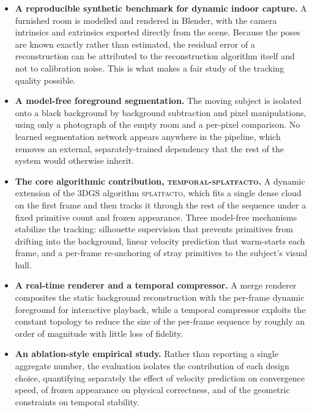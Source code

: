 \begin{itemize}
    \item \textbf{A reproducible synthetic benchmark for dynamic indoor
    capture.} A furnished room is modelled and rendered in Blender, with the
    camera intrinsics and extrinsics exported directly from the scene. Because
    the poses are known exactly rather than estimated, the residual error of a
    reconstruction can be attributed to the reconstruction algorithm itself and
    not to calibration noise. This is what makes a fair study of the tracking
    quality possible.

    \item \textbf{A model-free foreground segmentation.} The moving subject is
    isolated onto a black background by background subtraction and pixel
    manipulations, using only a photograph of the empty room and a per-pixel
    comparison. No learned segmentation network appears anywhere in the
    pipeline, which removes an external, separately-trained dependency that the
    rest of the system would otherwise inherit.

    \item \textbf{The core algorithmic contribution,
    \textsc{temporal-splatfacto}.} A dynamic extension of the 3DGS algorithm
    \textsc{splatfacto}, which fits a single dense cloud on the first frame and
    then tracks it through the rest of the sequence under a fixed primitive
    count and frozen appearance. Three model-free mechanisms stabilize the
    tracking: silhouette supervision that prevents primitives from drifting into
    the background, linear velocity prediction that warm-starts each frame, and a
    per-frame re-anchoring of stray primitives to the subject's visual hull.

    \item \textbf{A real-time renderer and a temporal compressor.} A merge
    renderer composites the static background reconstruction with the per-frame
    dynamic foreground for interactive playback, while a temporal compressor
    exploits the constant topology to reduce the size of the per-frame sequence
    by roughly an order of magnitude with little loss of fidelity.

    \item \textbf{An ablation-style empirical study.} Rather than reporting a
    single aggregate number, the evaluation isolates the contribution of each
    design choice, quantifying separately the effect of velocity prediction on
    convergence speed, of frozen appearance on physical correctness, and of the
    geometric constraints on temporal stability.
\end{itemize}


